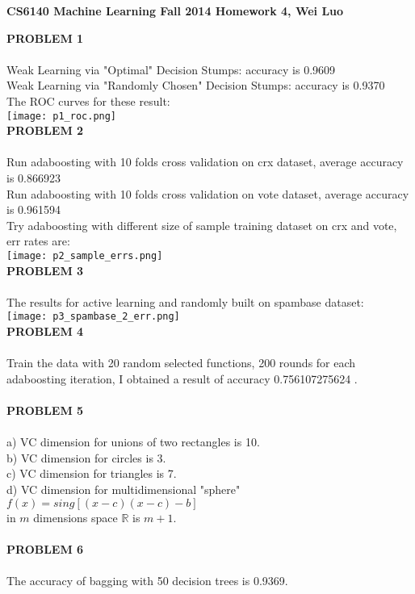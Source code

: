 \documentclass[11pt,a4paper,fleqn]{article}
\begin{document}
\begin{center}
\textbf{CS6140 Machine Learning Fall 2014 Homework 4, Wei Luo }\\
\end{center}
\textbf{PROBLEM 1}\\
\\
Weak Learning via "Optimal" Decision Stumps: accuracy is 0.9609\\
Weak Learning via "Randomly Chosen" Decision Stumps: accuracy is 0.9370\\
The ROC curves for these result:\\
\texttt{[image: p1\_roc.png]}\\
\textbf{PROBLEM 2}\\
\\
Run adaboosting with 10 folds cross validation on crx dataset, average accuracy is 0.866923\\
Run adaboosting with 10 folds cross validation on vote dataset, average accuracy is 0.961594\\
Try adaboosting with different size of sample training dataset on crx and vote, err rates are:\\
\texttt{[image: p2\_sample\_errs.png]}\\
\newpage \noindent
\textbf{PROBLEM 3}\\
\\
The results for active learning and randomly built on spambase dataset:\\
\texttt{[image: p3\_spambase\_2\_err.png]}\\
\textbf{PROBLEM 4}\\
\\
Train the data with 20 random selected functions, 200 rounds for each adaboosting iteration, I obtained a result of accuracy 0.756107275624 .\\
\\
\textbf{PROBLEM 5}\\
\\
a) VC dimension for unions of two rectangles is 10.\\
b) VC dimension for circles is 3.\\
c) VC dimension for triangles is 7.\\
d) VC dimension for multidimensional "sphere" $f(x)=sing[(x-c)(x-c)-b]$ \\in $m$ dimensions space $\mathbb{R}$ is $m+1$.\\
\\
\textbf{PROBLEM 6}\\
\\
The accuracy of bagging with 50 decision trees is 0.9369.\\
\end{document}
